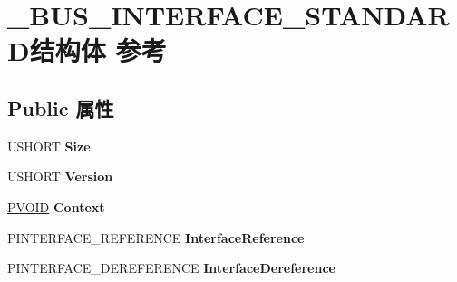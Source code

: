 \hypertarget{struct___b_u_s___i_n_t_e_r_f_a_c_e___s_t_a_n_d_a_r_d}{}\section{\+\_\+\+B\+U\+S\+\_\+\+I\+N\+T\+E\+R\+F\+A\+C\+E\+\_\+\+S\+T\+A\+N\+D\+A\+R\+D结构体 参考}
\label{struct___b_u_s___i_n_t_e_r_f_a_c_e___s_t_a_n_d_a_r_d}
\subsection*{Public 属性}
\begin{DoxyCompactItemize}
\item 
\mbox{\label{struct___b_u_s___i_n_t_e_r_f_a_c_e___s_t_a_n_d_a_r_d_ad66aa238742067199fe2c862137a1f20}} 
U\+S\+H\+O\+RT {\bfseries Size}
\item 
\mbox{\label{struct___b_u_s___i_n_t_e_r_f_a_c_e___s_t_a_n_d_a_r_d_a10b88df578604bb90455773eaf337b58}} 
U\+S\+H\+O\+RT {\bfseries Version}
\item 
\mbox{\label{struct___b_u_s___i_n_t_e_r_f_a_c_e___s_t_a_n_d_a_r_d_aa38d3a2c1debdc1c2338c417effe2720}} 
\hyperlink{interfacevoid}{P\+V\+O\+ID} {\bfseries Context}
\item 
\mbox{\label{struct___b_u_s___i_n_t_e_r_f_a_c_e___s_t_a_n_d_a_r_d_a02422eb8e74caa90e921d39614e79ef3}} 
P\+I\+N\+T\+E\+R\+F\+A\+C\+E\+\_\+\+R\+E\+F\+E\+R\+E\+N\+CE {\bfseries Interface\+Reference}
\item 
\mbox{\label{struct___b_u_s___i_n_t_e_r_f_a_c_e___s_t_a_n_d_a_r_d_a3925da53a78dbc24bbe42f7a312e4914}} 
P\+I\+N\+T\+E\+R\+F\+A\+C\+E\+\_\+\+D\+E\+R\+E\+F\+E\+R\+E\+N\+CE {\bfseries Interface\+Dereference}
\item 
\mbox{\label{struct___b_u_s___i_n_t_e_r_f_a_c_e___s_t_a_n_d_a_r_d_a104aed7b43ea7e9d90db0f7a3ed2465d}} 

\end{DoxyCompactItemize}
